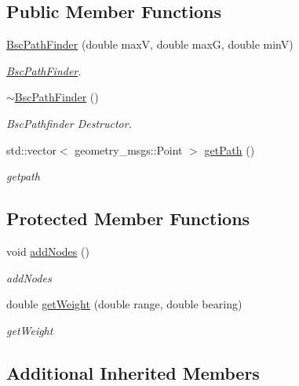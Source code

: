 \subsection*{Public Member Functions}
\begin{DoxyCompactItemize}
\item 
\hyperlink{classBscPathFinder_aa360fb55393b67d37331c3fc06cb8231}{Bsc\+Path\+Finder} (double maxV, double maxG, double minV)
\begin{DoxyCompactList}\small\item\em \hyperlink{classBscPathFinder}{Bsc\+Path\+Finder}. \end{DoxyCompactList}\item 
\mbox{\label{classBscPathFinder_a26c9f756fd50796b3d3848dba82bb957}} 
\hyperlink{classBscPathFinder_a26c9f756fd50796b3d3848dba82bb957}{$\sim$\+Bsc\+Path\+Finder} ()
\begin{DoxyCompactList}\small\item\em Bsc\+Pathfinder Destructor. \end{DoxyCompactList}\item 
std\+::vector$<$ geometry\+\_\+msgs\+::\+Point $>$ \hyperlink{classBscPathFinder_abbcde7b0e482fdc4f3fb1428c88bccb5}{get\+Path} ()
\begin{DoxyCompactList}\small\item\em getpath \end{DoxyCompactList}\end{DoxyCompactItemize}
\subsection*{Protected Member Functions}
\begin{DoxyCompactItemize}
\item 
void \hyperlink{classBscPathFinder_a2bba029656eeb264e4035e3e5dd91726}{add\+Nodes} ()
\begin{DoxyCompactList}\small\item\em add\+Nodes \end{DoxyCompactList}\item 
double \hyperlink{classBscPathFinder_a0b0e1491b8819d4882575c39bb5def82}{get\+Weight} (double range, double bearing)
\begin{DoxyCompactList}\small\item\em get\+Weight \end{DoxyCompactList}\end{DoxyCompactItemize}
\subsection*{Additional Inherited Members}


